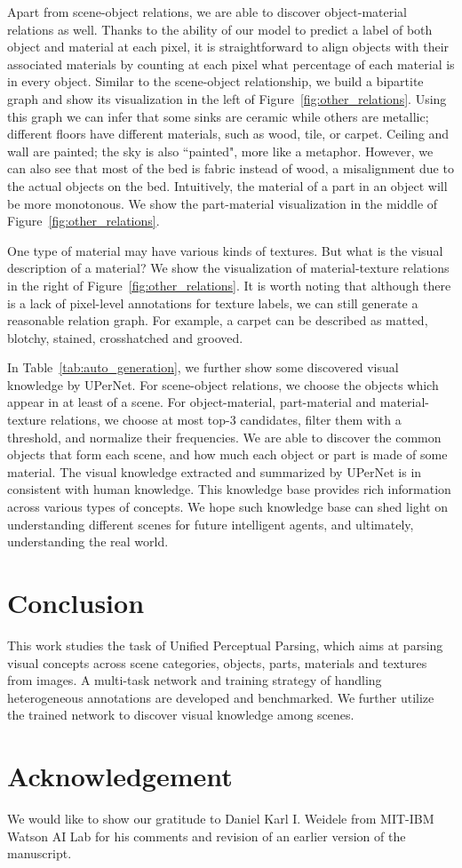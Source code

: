 \documentclass[runningheads]{llncs}
\begin{document}
 Apart from scene-object relations, we are able to discover object-material relations as well. Thanks to the ability of our model to predict a label of both object and material at each pixel, it is straightforward to align objects with their associated materials by counting at each pixel what percentage of each material is in every object. Similar to the scene-object relationship, we build a bipartite graph and show its visualization in the left of Figure~\ref{fig:other_relations}. Using this graph we can infer that some sinks are ceramic while others are metallic; different floors have different materials, such as wood, tile, or carpet. Ceiling and wall are painted; the sky is also ``painted", more like a metaphor. However, we can also see that most of the bed is fabric instead of wood, a misalignment due to the actual objects on the bed. Intuitively, the material of a part in an object will be more monotonous. We show the part-material visualization in the middle of Figure~\ref{fig:other_relations}. 

 One type of material may have various kinds of textures. But what is the visual description of a material? We show the visualization of material-texture relations in the right of Figure~\ref{fig:other_relations}. It is worth noting that although there is a lack of pixel-level annotations for texture labels, we can still generate a reasonable relation graph. For example, a carpet can be described as matted, blotchy, stained, crosshatched and grooved. 

In Table~\ref{tab:auto_generation}, we further show some discovered visual knowledge by UPerNet. For scene-object relations, we choose the objects which appear in at least  of a scene. For object-material, part-material and material-texture relations, we choose at most top-3 candidates, filter them with a threshold, and normalize their frequencies. We are able to discover the common objects that form each scene, and how much each object or part is made of some material. The visual knowledge extracted and summarized by UPerNet is in consistent with human knowledge. This knowledge base provides rich information across various types of concepts. We hope such knowledge base can shed light on understanding different scenes for future intelligent agents, and ultimately, understanding the real world.

\section{Conclusion}
This work studies the task of Unified Perceptual Parsing, which aims at parsing visual concepts across scene categories, objects, parts, materials and textures from images. A multi-task network and training strategy of handling heterogeneous annotations are developed and benchmarked. We further utilize the trained network to discover visual knowledge among scenes. 

\section*{Acknowledgement}
We would like to show our gratitude to Daniel Karl I. Weidele from MIT-IBM Watson AI Lab for his comments and revision of an earlier version of the manuscript.



\end{document}
